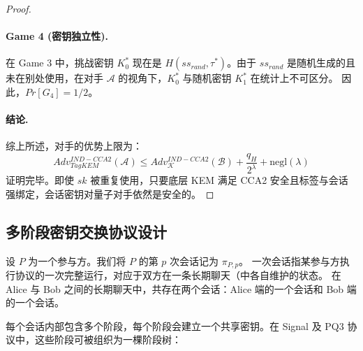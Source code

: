 \begin{proof}
\paragraph{Game 4 (密钥独立性).} 在 Game 3 中，挑战密钥 $K_0^*$ 现在是 $H(ss_{rand}, \tau^*)$。由于 $ss_{rand}$ 是随机生成的且未在别处使用，在对手 $\mathcal{A}$ 的视角下，$K_0^*$ 与随机密钥 $K_1^*$ 在统计上不可区分。
因此，$Pr[G_4] = 1/2$。

\paragraph{结论.}
综上所述，对手的优势上限为：
\begin{equation}
    Adv_{TagKEM}^{IND-CCA2}(\mathcal{A}) \leq Adv_{\mathcal{K}}^{IND-CCA2}(\mathcal{B}) + \frac{q_H}{2^\lambda} + \text{negl}(\lambda)
\end{equation}
证明完毕。即使 $sk$ 被重复使用，只要底层 KEM 满足 CCA2 安全且标签与会话强绑定，会话密钥对量子对手依然是安全的。
\end{proof}


\subsection{多阶段密钥交换协议设计}

设 $P$ 为一个参与方。我们将 $P$ 的第 $p$ 次会话记为 $\pi_{P,p}$。  
一次会话指某参与方执行协议的一次完整运行，对应于双方在一条长期聊天（中各自维护的状态。 在 Alice 与 Bob 之间的长期聊天中，共存在两个会话：Alice 端的一个会话和 Bob 端的一个会话。

每个会话内部包含多个阶段，每个阶段会建立一个共享密钥。在 Signal 及 PQ3 协议中，这些阶段可被组织为一棵阶段树：

